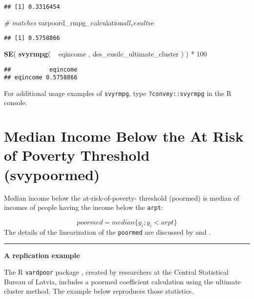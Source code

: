 \documentclass[]{book}
\newenvironment{Shaded}{\begin{snugshade}}{\end{snugshade}}
\newcommand{\KeywordTok}[1]{\textcolor[rgb]{0.13,0.29,0.53}{\textbf{{#1}}}}
\newcommand{\DecValTok}[1]{\textcolor[rgb]{0.00,0.00,0.81}{{#1}}}
\newcommand{\StringTok}[1]{\textcolor[rgb]{0.31,0.60,0.02}{{#1}}}
\newcommand{\CommentTok}[1]{\textcolor[rgb]{0.56,0.35,0.01}{\textit{{#1}}}}
\newcommand{\NormalTok}[1]{{#1}}
\begin{document}
\begin{verbatim}
## [1] 0.3316454
\end{verbatim}

\begin{Shaded}
\begin{Highlighting}[]
\CommentTok{# matches}
\NormalTok{varpoord_rmpg_calculation$all_result$se}
\end{Highlighting}
\end{Shaded}

\begin{verbatim}
## [1] 0.5758866
\end{verbatim}

\begin{Shaded}
\begin{Highlighting}[]
\KeywordTok{SE}\NormalTok{( }\KeywordTok{svyrmpg}\NormalTok{( ~}\StringTok{ }\NormalTok{eqincome , des_eusilc_ultimate_cluster ) ) *}\StringTok{ }\DecValTok{100}
\end{Highlighting}
\end{Shaded}

\begin{verbatim}
##           eqincome
## eqincome 0.5758866
\end{verbatim}

For additional usage examples of \texttt{svyrmpg}, type
\texttt{?convey::svyrmpg} in the R console.

\section{Median Income Below the At Risk of Poverty Threshold
(svypoormed)}\label{median-income-below-the-at-risk-of-poverty-threshold-svypoormed}

Median income below the at-risk-of-poverty- threshold (poormed) is
median of incomes of people having the income below the \texttt{arpt}:

\[
poormed = median\{y_i; y_i< arpt\}
\] The details of the linearization of the \texttt{poormed} are
discussed by \citet{deville1999} and \citet{osier2009}.

\begin{center}\rule{0.5\linewidth}{\linethickness}\end{center}

\textbf{A replication example}

The R \texttt{vardpoor} package \citep{vardpoor}, created by researchers
at the Central Statistical Bureau of Latvia, includes a poormed
coefficient calculation using the ultimate cluster method. The example
below reproduces those statistics.
\end{document}
